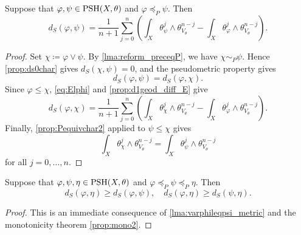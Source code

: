 \begin{lemma}\label{lma:varphileqpsi_metric}
    Suppose that $\varphi,\psi\in \mathrm{PSH}(X,\theta)$ and $\varphi\preceq_P \psi$. Then
    \[
    d_S(\varphi,\psi)=\frac{1}{n+1}\sum_{j=0}^n \left(\int_X \theta_{\psi}^j\wedge \theta_{V_{\theta}}^{n-j}-\int_X \theta_{\varphi}^j\wedge \theta_{V_{\theta}}^{n-j}\right).
    \]
\end{lemma}
\begin{proof}
    Set $\chi\coloneqq\varphi\lor\psi$. By \cref{lma:reform_preceqP}, we have $\chi\sim_P\psi$. Hence \cref{prop:ds0char} gives $d_S(\chi,\psi)=0$, and the pseudometric property gives
    \[
        d_S(\varphi,\psi)=d_S(\varphi,\chi).
    \]
    Since $\varphi\leq\chi$, \eqref{eq:Elphi} and \cref{prop:d1geod_diff_E} give
    \[
    d_S(\varphi,\chi)=\frac{1}{n+1}\sum_{j=0}^n \left(\int_X \theta_{\chi}^j\wedge \theta_{V_{\theta}}^{n-j}-\int_X \theta_{\varphi}^j\wedge \theta_{V_{\theta}}^{n-j}\right).
    \]
    Finally, \cref{prop:Pequivchar2} applied to $\psi\leq\chi$ gives
    \[
        \int_X \theta_{\chi}^j\wedge \theta_{V_{\theta}}^{n-j}=\int_X \theta_{\psi}^j\wedge \theta_{V_{\theta}}^{n-j}
    \]
    for all $j=0,\ldots,n$.
\end{proof}
\begin{corollary}\label{cor:dsthreeterm}
    Suppose that $\varphi,\psi,\eta\in \mathrm{PSH}(X,\theta)$ and $\varphi\preceq_P\psi\preceq_P \eta$. Then
    \[
        d_S(\varphi,\eta)\geq d_S(\varphi,\psi),\quad d_S(\varphi,\eta)\geq d_S(\psi,\eta).
    \]
\end{corollary}
\begin{proof}
    This is an immediate consequence of \cref{lma:varphileqpsi_metric} and the monotonicity theorem \cref{prop:mono2}.
\end{proof}

